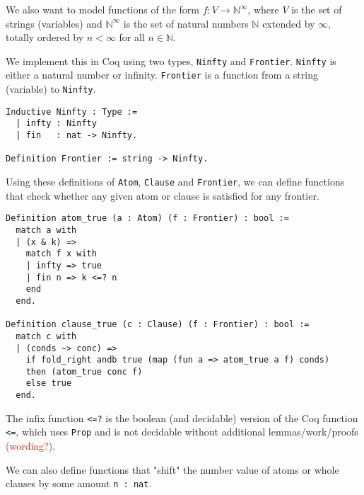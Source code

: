 We also want to model functions of the form $f : V \rightarrow \mathbb{N}^{\infty}$, where $V$ is the set of strings (variables)
and $\mathbb{N}^{\infty}$ is the set of natural numbers $\mathbb{N}$
extended by $\infty$, totally ordered by $n < \infty$ for all $n \in \mathbb{N}$.

We implement this in Coq using two types, \lstinline{Ninfty} and \lstinline{Frontier}.
\lstinline{Ninfty} is either a natural number or infinity.
\lstinline{Frontier} is a function from a string (variable) to \lstinline{Ninfty}.

\begin{minipage}{\linewidth}
\begin{lstlisting}[language=Coq, label={lst:ninfty_frontier_def}, caption={Def. of \lstinline{Ninfty} and \lstinline{Frontier} in Coq}]
Inductive Ninfty : Type :=
  | infty : Ninfty
  | fin   : nat -> Ninfty.

Definition Frontier := string -> Ninfty.
\end{lstlisting}
\end{minipage}

Using these definitions of \lstinline{Atom}, \lstinline{Clause} and \lstinline{Frontier},
we can define functions that check whether any given atom or clause is satisfied for any frontier.

\begin{minipage}{\linewidth}
\begin{lstlisting}[language=Coq, label={lst:atom_clause_true_def}, caption={Def. of \lstinline{atom_true} and \lstinline{clause_true} in Coq}]
Definition atom_true (a : Atom) (f : Frontier) : bool :=
  match a with
  | (x & k) =>
    match f x with
    | infty => true
    | fin n => k <=? n
    end
  end.

Definition clause_true (c : Clause) (f : Frontier) : bool :=
  match c with
  | (conds ~> conc) =>
    if fold_right andb true (map (fun a => atom_true a f) conds)
    then (atom_true conc f)
    else true
  end.
\end{lstlisting}
\end{minipage}

The infix function \lstinline{<=?} is the boolean (and decidable) version of the
Coq function \lstinline{<=}, which uses \lstinline{Prop} and is not decidable without
additional lemmas/work/proofs \textcolor{red}{(wording?)}.

We can also define functions that "shift" the number value of atoms or whole clauses by some amount \lstinline{n : nat}.

